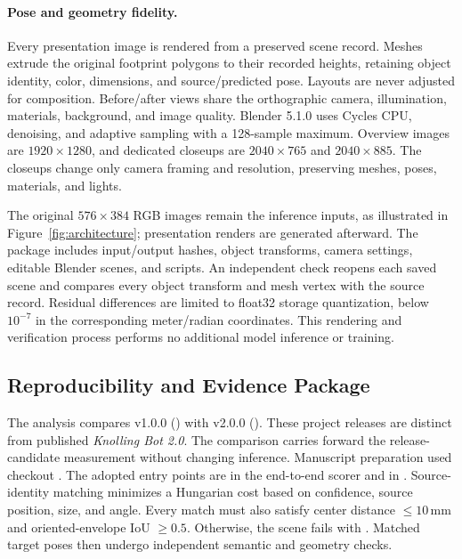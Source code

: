 \paragraph{Pose and geometry fidelity.}
Every presentation image is rendered from a preserved scene record. Meshes extrude the original footprint polygons to their recorded heights, retaining object identity, color, dimensions, and source/predicted pose. Layouts are never adjusted for composition. Before/after views share the orthographic camera, illumination, materials, background, and image quality. Blender 5.1.0 uses Cycles CPU, denoising, and adaptive sampling with a 128-sample maximum. Overview images are $1920\times1280$, and dedicated closeups are $2040\times765$ and $2040\times885$. The closeups change only camera framing and resolution, preserving meshes, poses, materials, and lights.

The original $576\times384$ RGB images remain the inference inputs, as illustrated in Figure~\ref{fig:architecture}; presentation renders are generated afterward. The package includes input/output hashes, object transforms, camera settings, editable Blender scenes, and scripts. An independent check reopens each saved scene and compares every object transform and mesh vertex with the source record. Residual differences are limited to float32 storage quantization, below $10^{-7}$ in the corresponding meter/radian coordinates. This rendering and verification process performs no additional model inference or training.

\subsection{Reproducibility and Evidence Package}
\label{app:reproducibility}
The analysis compares v1.0.0 () with v2.0.0 (). These project releases are distinct from published \emph{Knolling Bot 2.0}. The comparison carries forward the release-candidate measurement without changing inference. Manuscript preparation used checkout . The adopted entry points are  in the end-to-end scorer and  in . Source-identity matching minimizes a Hungarian cost based on confidence, source position, size, and angle. Every match must also satisfy center distance $\leq10$\,mm and oriented-envelope IoU $\geq0.5$. Otherwise, the scene fails with . Matched target poses then undergo independent semantic and geometry checks.

